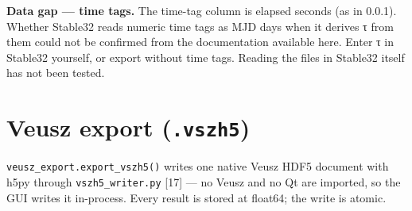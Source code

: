 \documentclass[10pt,a4paper]{article}
\begin{document}
\begin{notebox}

\textbf{Data gap --- time tags.} The time-tag column is elapsed seconds (as in
0.0.1). Whether Stable32 reads numeric time tags as MJD days when it derives
τ from them could not be confirmed from the documentation available here.
Enter τ in Stable32 yourself, or export without time tags. Reading the files
in Stable32 itself has not been tested.

\end{notebox}


\hypertarget{veusz-export-vszh5}{%
\section{\texorpdfstring{Veusz export (\texttt{.vszh5})}{Veusz export (.vszh5)}}\label{veusz-export-vszh5}}

\texttt{veusz\_\allowbreak{}export.\allowbreak{}export\_\allowbreak{}vszh5()} writes one native Veusz HDF5 document with h5py
through \texttt{vszh5\_\allowbreak{}writer.py} {[}17{]} --- no Veusz and no Qt are imported, so the GUI
writes it in-process. Every result is stored at float64; the write is atomic.
\end{document}
